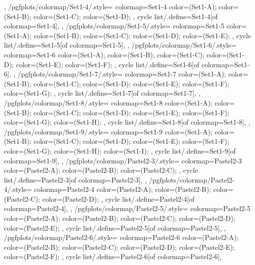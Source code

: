 {{  },
  /pgfplots/colormap/Set1-4/.style={
    colormap={Set1-4}{
      color=(Set1-A);
      color=(Set1-B);
      color=(Set1-C);
      color=(Set1-D);
    },
    cycle list/.define={Set1-4}{[of colormap=Set1-4]},
  },
  /pgfplots/colormap/Set1-5/.style={
    colormap={Set1-5}{
      color=(Set1-A);
      color=(Set1-B);
      color=(Set1-C);
      color=(Set1-D);
      color=(Set1-E);
    },
    cycle list/.define={Set1-5}{[of colormap=Set1-5]},
  },
  /pgfplots/colormap/Set1-6/.style={
    colormap={Set1-6}{
      color=(Set1-A);
      color=(Set1-B);
      color=(Set1-C);
      color=(Set1-D);
      color=(Set1-E);
      color=(Set1-F);
    },
    cycle list/.define={Set1-6}{[of colormap=Set1-6]},
  },
  /pgfplots/colormap/Set1-7/.style={
    colormap={Set1-7}{
      color=(Set1-A);
      color=(Set1-B);
      color=(Set1-C);
      color=(Set1-D);
      color=(Set1-E);
      color=(Set1-F);
      color=(Set1-G);
    },
    cycle list/.define={Set1-7}{[of colormap=Set1-7]},
  },
  /pgfplots/colormap/Set1-8/.style={
    colormap={Set1-8}{
      color=(Set1-A);
      color=(Set1-B);
      color=(Set1-C);
      color=(Set1-D);
      color=(Set1-E);
      color=(Set1-F);
      color=(Set1-G);
      color=(Set1-H);
    },
    cycle list/.define={Set1-8}{[of colormap=Set1-8]},
  },
  /pgfplots/colormap/Set1-9/.style={
    colormap={Set1-9}{
      color=(Set1-A);
      color=(Set1-B);
      color=(Set1-C);
      color=(Set1-D);
      color=(Set1-E);
      color=(Set1-F);
      color=(Set1-G);
      color=(Set1-H);
      color=(Set1-I);
    },
    cycle list/.define={Set1-9}{[of colormap=Set1-9]},
  },
  /pgfplots/colormap/Pastel2-3/.style={
    colormap={Pastel2-3}{
      color=(Pastel2-A);
      color=(Pastel2-B);
      color=(Pastel2-C);
    },
    cycle list/.define={Pastel2-3}{[of colormap=Pastel2-3]},
  },
  /pgfplots/colormap/Pastel2-4/.style={
    colormap={Pastel2-4}{
      color=(Pastel2-A);
      color=(Pastel2-B);
      color=(Pastel2-C);
      color=(Pastel2-D);
    },
    cycle list/.define={Pastel2-4}{[of colormap=Pastel2-4]},
  },
  /pgfplots/colormap/Pastel2-5/.style={
    colormap={Pastel2-5}{
      color=(Pastel2-A);
      color=(Pastel2-B);
      color=(Pastel2-C);
      color=(Pastel2-D);
      color=(Pastel2-E);
    },
    cycle list/.define={Pastel2-5}{[of colormap=Pastel2-5]},
  },
  /pgfplots/colormap/Pastel2-6/.style={
    colormap={Pastel2-6}{
      color=(Pastel2-A);
      color=(Pastel2-B);
      color=(Pastel2-C);
      color=(Pastel2-D);
      color=(Pastel2-E);
      color=(Pastel2-F);
    },
    cycle list/.define={Pastel2-6}{[of colormap=Pastel2-6]},
}}
